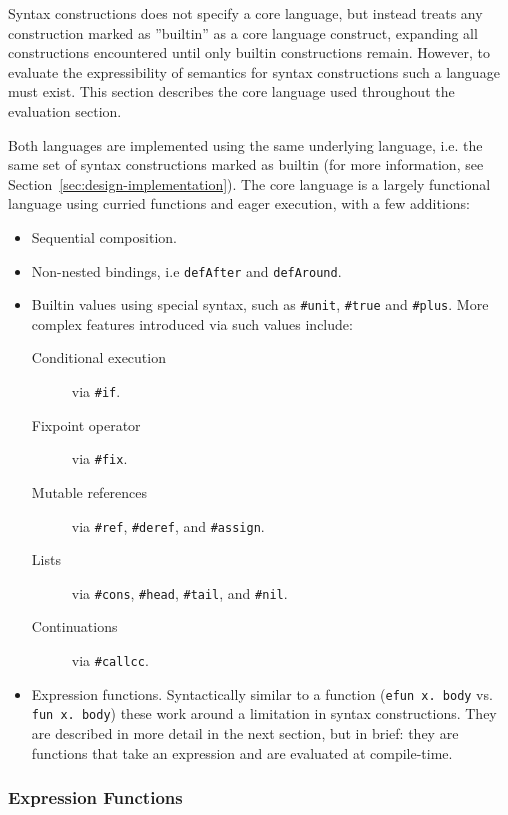 \documentclass{kththesis}
\begin{document}
Syntax constructions does not specify a core language, but instead treats any construction marked as ''builtin'' as a core language construct, expanding all constructions encountered until only builtin constructions remain. However, to evaluate the expressibility of semantics for syntax constructions such a language must exist. This section describes the core language used throughout the evaluation section.

Both languages are implemented using the same underlying language, i.e. the same set of syntax constructions marked as builtin (for more information, see Section~\ref{sec:design-implementation}). The core language is a largely functional language using curried functions and eager execution, with a few additions:
\begin{itemize}
  \item Sequential composition.
  \item Non-nested bindings, i.e \texttt{defAfter} and \texttt{defAround}. %
  \item Builtin values using special syntax, such as \texttt{#unit}, \texttt{#true} and \texttt{#plus}. More complex features introduced via such values include:
  \begin{description}
    \item[Conditional execution] via \texttt{#if}.
    \item[Fixpoint operator] via \texttt{#fix}.
    \item[Mutable references] via \texttt{#ref}, \texttt{#deref}, and \texttt{#assign}.
    \item[Lists] via \texttt{#cons}, \texttt{#head}, \texttt{#tail}, and \texttt{#nil}.
    \item[Continuations] via \texttt{#callcc}.
  \end{description}
  \item Expression functions. Syntactically similar to a function (\texttt{efun x. body} vs. \texttt{fun x. body}) these work around a limitation in syntax constructions. They are described in more detail in the next section, but in brief: they are functions that take an expression and are evaluated at compile-time.
\end{itemize}

\subsubsection{Expression Functions} \label{sec:efun-drawbacks}
\end{document}
